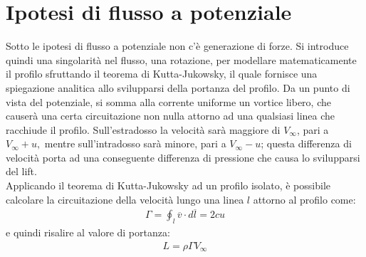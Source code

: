 \section{Ipotesi di flusso a potenziale}
Sotto le ipotesi di flusso a potenziale non c'è generazione di forze. Si introduce quindi una singolarità nel flusso, una rotazione, per modellare matematicamente il profilo sfruttando il teorema di Kutta-Jukowsky, il quale fornisce una spiegazione analitica allo svilupparsi della portanza del profilo. Da un punto di vista del potenziale, si somma alla corrente uniforme un vortice libero, che causerà una certa circuitazione non nulla attorno ad una qualsiasi linea che racchiude il profilo. Sull'estradosso la velocità sarà maggiore di $V_{\infty}$, pari a $V_{\infty}+u,$ mentre sull'intradosso sarà minore, pari a $V_{\infty}-u$; questa differenza di velocità porta ad una conseguente differenza di pressione che causa lo svilupparsi del lift.\\
Applicando il teorema di Kutta-Jukowsky ad un profilo isolato, è possibile calcolare la circuitazione della velocità lungo una linea $l$ attorno al profilo come:
\begin{align*}
\Gamma = \oint_l \overline{v} \cdot d \overline{l} = 2cu
\end{align*}
e quindi risalire al valore di portanza:
\begin{align*}
L=\rho \Gamma V_\infty
\end{align*}


